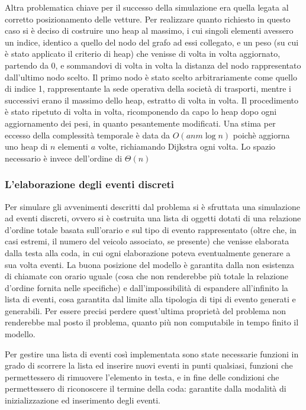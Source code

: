 \documentclass[a4paper,11pt]{Article}
\begin{document}
Altra problematica chiave per il successo della simulazione era quella legata al corretto posizionamento delle vetture.
Per realizzare quanto richiesto in questo caso si è deciso di costruire uno heap al massimo, i cui singoli elementi avessero un indice, identico a quello del nodo del grafo ad essi collegato, e un peso (su cui è stato applicato il criterio di heap) che venisse di volta in volta aggiornato, partendo da 0, e sommandovi di volta in volta la distanza del nodo rappresentato dall'ultimo nodo scelto. Il primo nodo è stato scelto arbitrariamente come quello di indice 1, rappresentante la sede operativa della società di trasporti, mentre i successivi erano il massimo dello heap, estratto di volta in volta. Il procedimento è stato ripetuto di volta in volta, ricomponendo da capo lo heap dopo ogni aggiornamento dei pesi, in quanto pesantemente modificati.
Una stima per eccesso della complessità temporale è data da $O(anm\log{}n)$ poichè aggiorna uno heap di $n$ elementi $a$ volte, richiamando Dijkstra ogni volta. Lo spazio necessario è invece dell'ordine di $\Theta(n)$

\subsubsection{L'elaborazione degli eventi discreti}
Per simulare gli avvenimenti descritti dal problema si è sfruttata una simulazione ad eventi discreti, ovvero si è costruita una lista di oggetti dotati di una relazione d'ordine totale basata sull'orario e sul tipo di evento rappresentato (oltre che, in casi estremi, il numero del veicolo associato, se presente) che venisse elaborata dalla testa alla coda, in cui ogni elaborazione poteva eventualmente generare a sua volta eventi.
La buona posizione del modello è garantita dalla non esistenza di chiamate con orario uguale (cosa che non renderebbe più totale la relazione d'ordine fornita nelle specifiche) e dall'impossibilità di espandere all'infinito la lista di eventi, cosa garantita dal limite alla tipologia di tipi di evento generati e generabili. Per essere precisi perdere quest'ultima proprietà del problema non renderebbe mal posto il problema, quanto più non computabile in tempo finito il modello.

Per gestire una lista di eventi così implementata sono state necessarie funzioni in grado di scorrere la lista ed inserire nuovi eventi in punti qualsiasi, funzioni che permettessero di rimuovere l'elemento in testa, e in fine delle condizioni che permettessero di riconoscere il termine della coda: garantite dalla modalità di inizializzazione ed inserimento degli eventi.
\end{document}
